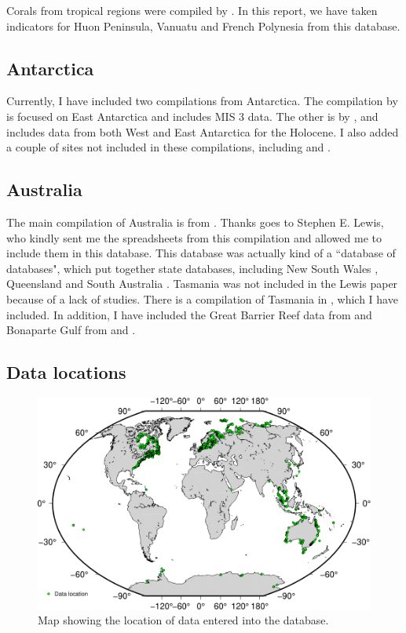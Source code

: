 Corals from tropical regions were compiled by \citet{HibbertEtal2016}. In this report, we have taken indicators for Huon Peninsula, Vanuatu and French Polynesia from this database.

\subsection{Antarctica}

Currently, I have included two compilations from Antarctica. The compilation by \citet{IshiwaEtal2021} is focused on East Antarctica and includes MIS 3 data. The other is by \citet{BriggsTarasov2013}, and includes data from both West and East Antarctica for the Holocene. I also added a couple of sites not included in these compilations, including \citet{HjortEtal1997} and \citet{BraddockEtal2022}.

\subsection{Australia}

The main compilation of Australia is from \citet{LewisEtal2013}. Thanks goes to Stephen E. Lewis, who kindly sent me the spreadsheets from this compilation and allowed me to include them in this database. This database was actually kind of a ``database of databases", which put together state databases, including New South Wales \citep{SlossEtal2007}, Queensland \citep{LarcombeEtal1995} and South Australia \citep{BelperioEtal2002}. Tasmania was not included in the Lewis paper because of a lack of studies. There is a compilation of Tasmania in \citet{Morrison2019}, which I have included. In addition, I have included the Great Barrier Reef data from \citet{YokoyamaEtal2018} and Bonaparte Gulf from \citet{YokoyamaEtal2000} and \citet{IshiwaEtal2019}.

\clearpage

\subsection{Data locations}

\begin{figure}[h]
\includegraphics[width=\textwidth]{../GIS/data_map.pdf}
\caption{Map showing the location of data entered into the database.}
\label{fig:data_map}
\end{figure}

\clearpage
